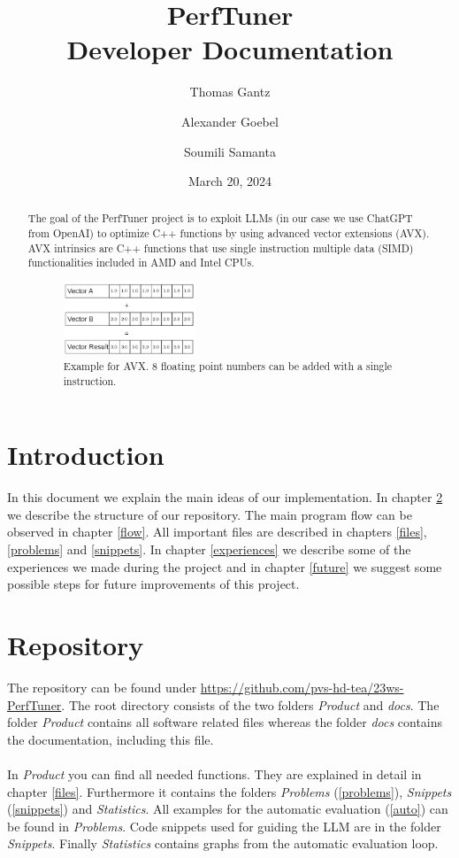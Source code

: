 \documentclass[twocolumn]{article}
\title{\LARGE \bf PerfTuner \\Developer Documentation}
\author{Thomas Gantz \and Alexander Goebel \and Soumili Samanta}
\date{March 20, 2024}
\begin{document}
\maketitle

\begin{abstract}
    The goal of the PerfTuner project is to exploit LLMs (in our case we use ChatGPT from OpenAI) to optimize C++ functions by using advanced vector extensions (AVX). AVX intrinsics are C++ functions that use single instruction multiple data (SIMD) functionalities included in AMD and Intel CPUs.  
    \begin{figure}[h]
        \centering
        \includegraphics[width=0.4\textwidth]{images/AVX_principle.png} 
        \caption{Example for AVX. 8 floating point numbers can be added with a single instruction.}
        \label{fig:bild1}
    \end{figure}
\end{abstract}

\section{Introduction}
In this document we explain the main ideas of our implementation. In chapter \ref{structure} we describe the structure of our repository. The main program flow can be observed in chapter \ref{flow}. All important files are described in chapters \ref{files}, \ref{problems} and \ref{snippets}. In chapter \ref{experiences} we describe some of the experiences we made during the project and in chapter \ref{future} we suggest some possible steps for future improvements of this project.

\section{Repository} \label{structure}
The repository can be found under \url{https://github.com/pvs-hd-tea/23ws-PerfTuner}. The root directory consists of the two folders \textit{Product} and \textit{docs}. The folder \textit{Product} contains all software related files whereas the folder \textit{docs} contains the documentation, including this file.\\
\\
In \textit{Product} you can find all needed functions. They are explained in detail in chapter \ref{files}. 
Furthermore it contains the folders \textit{Problems} (\ref{problems}), \textit{Snippets} (\ref{snippets}) and \textit{Statistics}. All examples for the automatic evaluation (\ref{auto}) can be found in \textit{Problems}. Code snippets used for guiding the LLM are in the folder \textit{Snippets}. Finally \textit{Statistics} contains graphs from the automatic evaluation loop.
\end{document}

